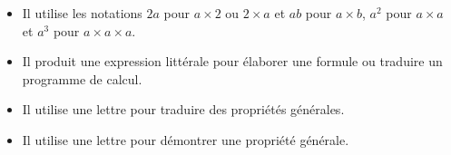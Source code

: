 \begin{prerequis}[Objectifs de 5\up{e}]  
    \begin{itemize}  
        \item Il utilise les notations $2a$ pour $a\times2$ ou $2\times a$ et $ab$ pour $a\times b$, 
        $a^2$ pour $a\times a$ et $a^3$ pour $a\times a\times a$.
        \item Il produit une expression littérale pour élaborer une formule ou traduire un programme de calcul.
        \columnbreak
        \item Il utilise une lettre pour traduire des propriétés générales.
        \item Il utilise une lettre pour démontrer une propriété générale.
    \end{itemize}
\end{prerequis}
